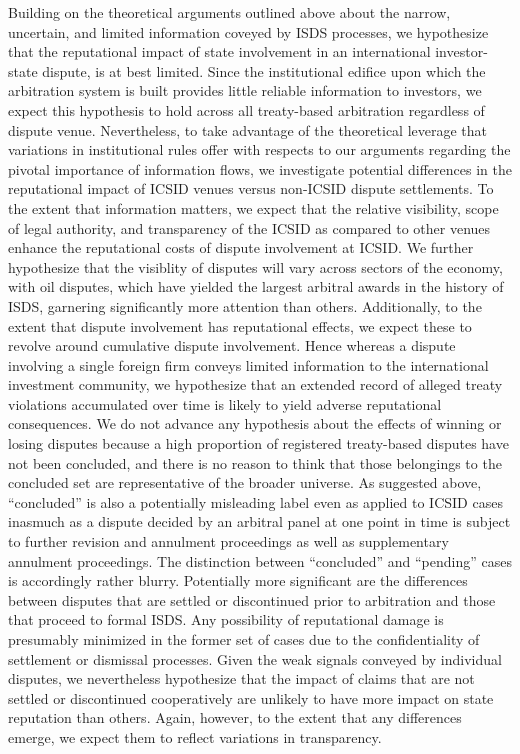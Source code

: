 \documentclass[12pt,onesided]{amsart}
\begin{document}
Building on the theoretical arguments outlined above about the narrow, uncertain, and limited information coveyed by ISDS processes, we hypothesize that the reputational impact of state involvement in an international investor-state dispute, is at best limited. Since the institutional edifice upon which the arbitration system is built provides little reliable information to investors, we expect this hypothesis to hold across all treaty-based arbitration regardless of dispute venue. Nevertheless, to take advantage of the theoretical leverage that variations in institutional rules offer with respects to our arguments regarding the pivotal importance of information flows, we investigate potential differences in the reputational impact of ICSID venues versus non-ICSID dispute settlements. To the extent that information matters, we expect that the relative visibility, scope of legal authority, and transparency of the ICSID as compared to other venues enhance the reputational costs of dispute involvement at ICSID. We further hypothesize that the visiblity of disputes will vary across sectors of the economy, with oil disputes, which have yielded the largest arbitral awards in the history of ISDS, garnering significantly more attention than others. Additionally, to the extent that dispute involvement has reputational effects, we expect these to revolve around cumulative dispute involvement. Hence whereas a dispute involving a single foreign firm conveys limited information to the international investment community, we hypothesize that an extended record of alleged treaty violations accumulated over time is likely to yield adverse reputational consequences. We do not advance any hypothesis about the effects of winning or losing disputes because a high proportion of registered treaty-based disputes have not been concluded, and there is no reason to think that those belongings to the concluded set are representative of the broader universe. As suggested above, ``concluded'' is also a potentially misleading label even as applied to ICSID cases inasmuch as a dispute decided by an arbitral panel at one point in time is subject to further revision and annulment proceedings as well as supplementary annulment proceedings. The distinction between ``concluded'' and ``pending'' cases is accordingly rather blurry. Potentially more significant are the differences between disputes that are settled or discontinued prior to arbitration and those that proceed to formal ISDS. Any possibility of reputational damage is presumably minimized in the former set of cases due to the confidentiality of settlement or dismissal processes. Given the weak signals conveyed by individual disputes, we nevertheless hypothesize that the impact of claims that are not settled or discontinued cooperatively are unlikely to have more impact on state reputation than others. Again, however, to the extent that any differences emerge, we expect them to reflect variations in transparency. 
\end{document}
